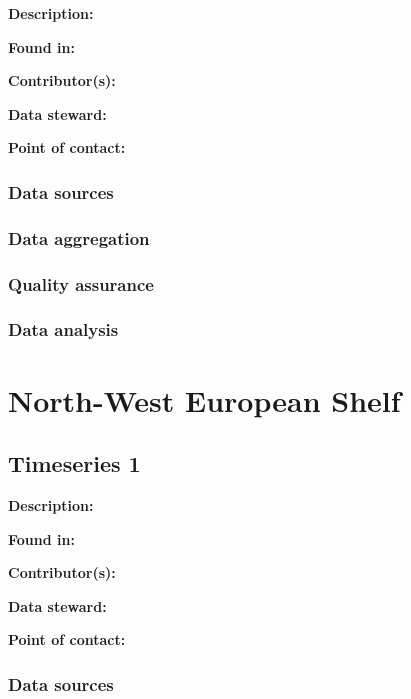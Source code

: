 \documentclass[
]{book}
\begin{document}
\textbf{Description:}

\textbf{Found in:}

\textbf{Contributor(s):}

\textbf{Data steward:}

\textbf{Point of contact:}

\hypertarget{data-sources-4}{%
\subsection{Data sources}\label{data-sources-4}}

\hypertarget{data-aggregation-4}{%
\subsection{Data aggregation}\label{data-aggregation-4}}

\hypertarget{quality-assurance-4}{%
\subsection{Quality assurance}\label{quality-assurance-4}}

\hypertarget{data-analysis-4}{%
\subsection{Data analysis}\label{data-analysis-4}}

\hypertarget{north-west-european-shelf}{%
\chapter{North-West European Shelf}\label{north-west-european-shelf}}

\hypertarget{timeseries-1-4}{%
\section{Timeseries 1}\label{timeseries-1-4}}

\textbf{Description:}

\textbf{Found in:}

\textbf{Contributor(s):}

\textbf{Data steward:}

\textbf{Point of contact:}

\hypertarget{data-sources-5}{%
\subsection{Data sources}\label{data-sources-5}}
\end{document}
